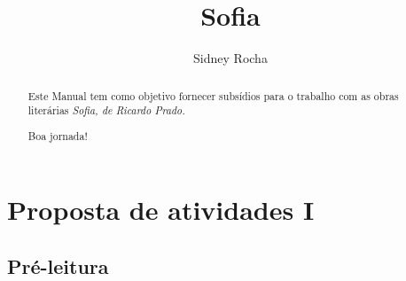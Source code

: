 \documentclass{extarticle}
\begin{document}
\newcommand{\AutorLivro}{Sidney Rocha}
\newcommand{\TituloLivro}{Sofia}
\newcommand{\Tema}{Ficção, mistério e fantasia}
\newcommand{\Genero}{Romance}
\newcommand{\imagemCapa}{./images/PNLD0054-01.png}
\newcommand{\issnppub}{---}
\newcommand{\issnepub}{---}
\newcommand{\colaborador}{\textbf{Fulano de Tal} é uma pessoa incrível e vai fazer um bom serviço.}


\title{\TituloLivro}
\author{\AutorLivro}
\def\authornotes{\colaborador}

\date{}
\maketitle

\begin{abstract}
\lipsum[1-3]
\end{abstract}

\tableofcontents


\begin{abstract}

Este Manual tem como objetivo fornecer subsídios para o trabalho com as
obras literárias \emph{Sofia, de Ricardo Prado.}


Boa jornada!

\end{abstract}

\section{Proposta de atividades I}

\subsection{Pré-leitura}




\end{document}
